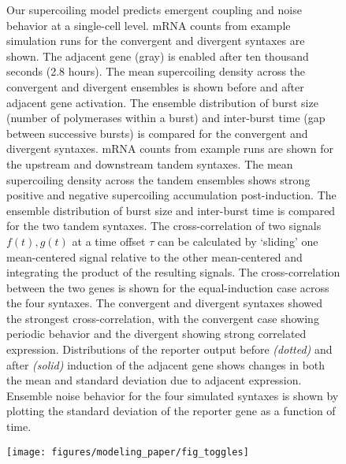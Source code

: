 \documentclass[11pt]{article}
\begin{document}
\begin{figure}[htbp]
    \ContinuedFloat
    \caption{Our supercoiling model predicts emergent coupling and noise behavior at a single-cell level.
         mRNA counts from example simulation runs for the convergent and divergent syntaxes are shown. The adjacent gene (gray) is enabled after ten thousand seconds (2.8 hours).%
         The mean supercoiling density across the convergent and divergent ensembles is shown before and after adjacent gene activation.
         The ensemble distribution of burst size (number of polymerases within a burst) and inter-burst time (gap between successive bursts) is compared for the convergent and divergent syntaxes.
         mRNA counts from example runs are shown for the upstream and downstream tandem syntaxes.
         The mean supercoiling density across the tandem ensembles shows strong positive and negative supercoiling accumulation post-induction. %
         The ensemble distribution of burst size and inter-burst time is compared for the two tandem syntaxes.
         The cross-correlation of two signals \(f(t), g(t)\) at a time offset \(\tau\) can be calculated by `sliding' one mean-centered signal relative to the other mean-centered and integrating the product of the resulting signals.
         The cross-correlation between the two genes is shown for the equal-induction case across the four syntaxes. The convergent and divergent syntaxes showed the strongest cross-correlation, with the convergent case showing periodic behavior and the divergent showing strong correlated expression.
         Distributions of the reporter output before \textit{(dotted)} and after \textit{(solid)} induction of the adjacent gene shows changes in both the mean and standard deviation due to adjacent expression.
         Ensemble noise behavior for the four simulated syntaxes is shown by plotting the standard deviation of the reporter gene as a function of time.
    }
    \label{fig:top:single_cell_noise_correlation}
\end{figure}
\begin{figure}[htbp]
    \centering
    {\texttt{[image: figures/modeling\_paper/fig\_toggles]}
    \label{fig:toggle_cartoon}
    \label{fig:toggle_basin_stability_over_time}
    \label{fig:toggle_stable_frac_n_2.0}
    \label{fig:toggle_burst_size}
    \label{fig:toggle_basin_stability}
    \label{fig:toggle_vs_topo_rate}
    \label{fig:toggle_half_life_vs_mRNA_deg}
    }
\end{figure}
\end{document}
